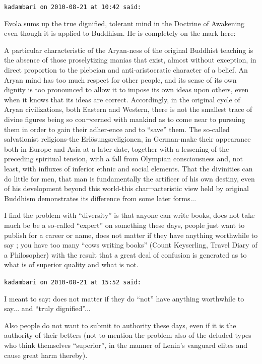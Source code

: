 \begin{footnotesize}
\begin{sffamily}
\texttt{kadambari on 2010-08-21 at 10:42 said:}

Evola sums up the true dignified, tolerant mind in the Doctrine of Awakening even though it is applied to Buddhism. He is completely on the mark here:

A particular characteristic of the Aryan-ness of the original Buddhist teaching is the absence of those proselytizing manias that exist, almost without exception, in direct proportion to the plebeian and anti-aristocratic character of a belief. An Aryan mind has too much respect for other people, and its sense of its own dignity is too pronounced to allow it to impose its own ideas upon others, even when it knows that its ideas are correct. Accordingly, in the original cycle of Aryan civilizations, both Eastern and Western, there is not the smallest trace of divine figures being so con¬cerned with mankind as to come near to pursuing them in order to gain their adher-ence and to ``save'' them. The so-called salvationist religions-the Erlösungsreligionen, in German-make their appearance both in Europe and Asia at a later date, together with a lessening of the preceding spiritual tension, with a fall from Olympian consciousness and, not least, with influxes of inferior ethnic and social elements. That the divinities can do little for men, that man is fundamentally the artificer of his own destiny, even of his development beyond this world-this char¬acteristic view held by original Buddhism demonstrates its difference from some later forms... 

I find the problem with ``diversity'' is that anyone can write books, does not take much be be a so-called ``expert'' on something these days, people just want to publish for a career or name, does not matter if they have anything worthwhile to say ; you have too many ``cows writing books'' (Count Keyserling, Travel Diary of a Philosopher) with the result that a great deal of confusion is generated as to what is of superior quality and what is not.

\hfill

\texttt{kadambari on 2010-08-21 at 15:52 said:}

I meant to say: does not matter if they do ``not'' have anything worthwhile to say... and ``truly dignified''... 

Also people do not want to submit to authority these days, even if it is the authority of their betters (not to mention the problem also of the deluded types who think themselves ``superior'', in the manner of Lenin's vanguard elites and cause great harm thereby).


\hfill

\end{sffamily}
\end{footnotesize}

